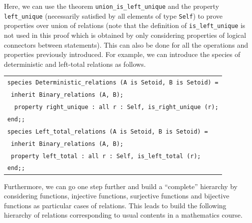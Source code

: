 \documentclass[submission,copyright,creativecommons]{eptcs}
\begin{document}
\noindent
Here, we can use the theorem {\footnotesize \tt union\_is\_left\_unique} 
and the property {\footnotesize \tt left\_unique} (necessarily satisfied by all
elements of type {\footnotesize \tt Self}) to prove properties over
union of relations (note that the definition of {\footnotesize \tt is\_left\_unique} 
is not used in this proof which is obtained by only considering
properties of logical connectors between statements). 
This can also be done for all the operations and properties previously
introduced. 
For example, we can introduce the species of deterministic and
left-total relations as follows.

\begin{center}
\begin{scriptsize}
\begin{tabular}{|l|}
\hline
\verb+species Deterministic_relations (A is Setoid, B is Setoid) =+\\
\verb+ inherit Binary_relations (A, B);+\\
\verb+  property right_unique : all r : Self, is_right_unique (r);+\\
\verb+end;;+\\
\verb+species Left_total_relations (A is Setoid, B is Setoid) =+\\
\verb+ inherit Binary_relations (A, B);+\\
\verb+ property left_total : all r : Self, is_left_total (r);+\\
\verb+end;;+\\
\hline
\end{tabular}
\end{scriptsize}
\end{center}

\noindent
Furthermore, we can go one step further and build a
``complete'' hierarchy by considering functions, injective functions,
surjective functions and bijective functions as particular cases of
relations.
This leads to build the following hierarchy of relations corresponding
to usual contents in a mathematics course.
\end{document}
